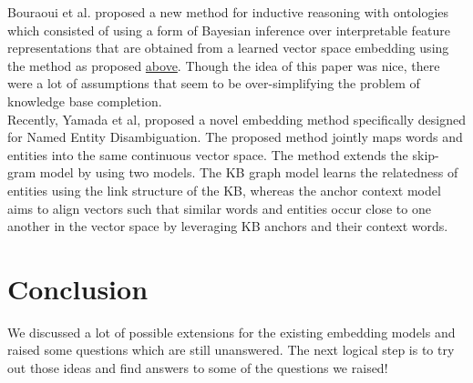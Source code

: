 \documentclass[12pt]{article}
\begin{document}
Bouraoui et al.\cite{DBLP:conf/aaai/BouraouiJS17} proposed a new method for inductive reasoning with ontologies which consisted of using a form of
Bayesian inference over interpretable feature representations
that are obtained from a learned vector space embedding using the method as proposed \hyperref[entity]{above}. Though the idea of this paper was nice, there were a lot of assumptions that seem to be over-simplifying the problem of knowledge base completion.\\

Recently, Yamada et al\cite{DBLP:journals/corr/YamadaS0T16},  proposed a novel embedding method specifically designed for Named Entity Disambiguation. The proposed method jointly maps words and entities into the same continuous vector space. The method extends the skip-gram model by using two models. The KB graph model learns the relatedness of entities using the link structure of the KB, whereas the anchor context model aims to align vectors such that similar words and entities occur close to one another in the vector space by leveraging KB anchors and their context words.

\section{Conclusion}
We discussed a lot of possible extensions for the existing embedding models and raised some questions which are still unanswered. The next logical step is to try out those ideas and find answers to some of the questions we raised!


\addtocounter{section}{1}

\end{document}
